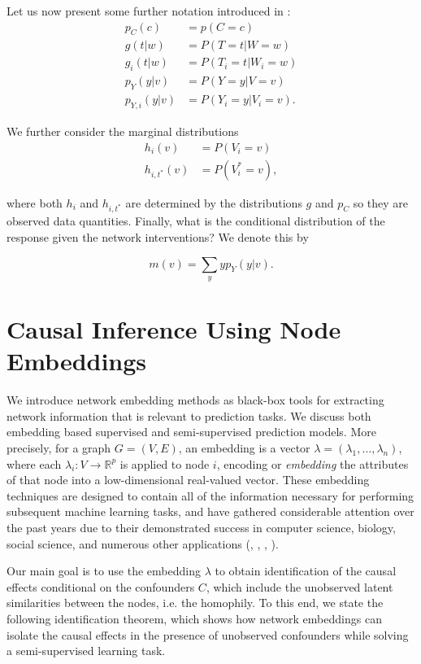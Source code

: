 \documentclass{article}
\begin{document}
Let us now present some further notation introduced in \cite{Ogburn:Sofrygin:Diaz:vanderLaan:2017}: 
\begin{align*}
p_C(c) &= p(C = c)\\
g(t|w) &= P(T = t| W =w)\\
g_i(t|w) &= P(T_i = t| W_i =w)\\
p_{Y}(y|v) &= P(Y = y|V  =  v) \\
p_{Y,  i}(y|v) &=  P(Y_i = y|V_i= v). 
\end{align*}

\noindent We further consider the marginal distributions
\begin{align*}
h_i(v) &= P(V_i = v) \\
h_{i, t^*}(v) &= P(V_i^* = v),
\end{align*}

\noindent where both  $h_i$ and $h_{i, t^*}$ are determined by the distributions $g$ and $p_C$ so they are observed data quantities. Finally, what is the conditional distribution of the response given the network interventions? We denote this by 

$$m(v) = \sum_y yp_Y(y|v). $$

\section{Causal Inference Using Node Embeddings}
\label{sec:embeddings}
We introduce network embedding methods as black-box tools for extracting network information that is relevant to prediction tasks. We discuss both embedding based supervised and semi-supervised prediction models. More precisely, for a graph $G = (V, E)$, an embedding is a vector $\lambda = (\lambda_1, \hdots, \lambda_n)$, where each $\lambda_i: V \to \mathbb{R}^p$ is applied to node $i$, encoding or \textit{embedding} the attributes of that node into a low-dimensional real-valued vector. These embedding techniques are designed to contain all of the information necessary for performing subsequent machine learning tasks, and have gathered considerable attention over the past years due to their demonstrated success in computer science, biology, social science, and numerous other applications (\cite{Hamilton:Ying:Leskovec:2018}, \cite{Chamberlain:Clough:Deisenroth:2017}, \cite{Perozzi:Al-Rfou:Skiena:2014}, \cite{Veitch:Austern:Zhou:Blei:Orbanz:2019}). 



Our main goal is to use the embedding $\lambda$ to obtain identification of the causal effects conditional on the confounders $C$, which include the unobserved latent similarities between the nodes, i.e. the homophily. To this end, we state the following identification theorem, which shows how network embeddings can isolate the causal effects in the presence of unobserved confounders while solving a semi-supervised learning task. 
\end{document}
